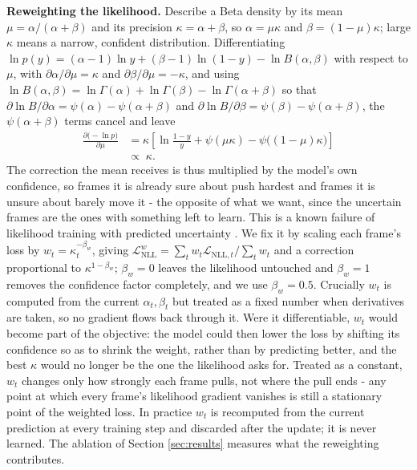 \documentclass[10pt,a4paper,twocolumn]{article}
\begin{document}
	\textbf{Reweighting the likelihood.} Describe a Beta density by its mean $\mu = \alpha/(\alpha+\beta)$ and its precision $\kappa = \alpha+\beta$, so $\alpha = \mu\kappa$ and $\beta = (1-\mu)\kappa$; large $\kappa$ means a narrow, confident distribution. Differentiating $\ln p(y) = (\alpha-1)\ln y + (\beta-1)\ln(1-y) - \ln B(\alpha,\beta)$ with respect to $\mu$, with $\partial\alpha/\partial\mu = \kappa$ and $\partial\beta/\partial\mu = -\kappa$, and using $\ln B(\alpha,\beta) = \ln\Gamma(\alpha)+\ln\Gamma(\beta)-\ln\Gamma(\alpha+\beta)$ so that $\partial \ln B/\partial\alpha = \psi(\alpha)-\psi(\alpha+\beta)$ and $\partial \ln B/\partial\beta = \psi(\beta)-\psi(\alpha+\beta)$, the $\psi(\alpha+\beta)$ terms cancel and leave
	$$\begin{aligned}\frac{\partial\bigl(-\ln p\bigr)}{\partial \mu} &= \kappa\left[\ln\frac{1-y}{y} + \psi(\mu\kappa) - \psi\bigl((1-\mu)\kappa\bigr)\right] \\ &\propto\; \kappa .\end{aligned}$$
	The correction the mean receives is thus multiplied by the model's own confidence, so frames it is already sure about push hardest and frames it is unsure about barely move it - the opposite of what we want, since the uncertain frames are the ones with something left to learn. This is a known failure of likelihood training with predicted uncertainty \cite{seitzer2022}. We fix it by scaling each frame's loss by $w_t = \kappa_t^{-\beta_w}$, giving $\mathcal{L}_{\text{NLL}}^{w} = \sum_t w_t \mathcal{L}_{\text{NLL},t} / \sum_t w_t$ and a correction proportional to $\kappa^{1-\beta_w}$; $\beta_w = 0$ leaves the likelihood untouched and $\beta_w = 1$ removes the confidence factor completely, and we use $\beta_w = 0.5$. Crucially $w_t$ is computed from the current $\alpha_t, \beta_t$ but treated as a fixed number when derivatives are taken, so no gradient flows back through it. Were it differentiable, $w_t$ would become part of the objective: the model could then lower the loss by shifting its confidence so as to shrink the weight, rather than by predicting better, and the best $\kappa$ would no longer be the one the likelihood asks for. Treated as a constant, $w_t$ changes only how strongly each frame pulls, not where the pull ends - any point at which every frame's likelihood gradient vanishes is still a stationary point of the weighted loss. In practice $w_t$ is recomputed from the current prediction at every training step and discarded after the update; it is never learned. The ablation of Section \ref{sec:results} measures what the reweighting contributes.
\end{document}
